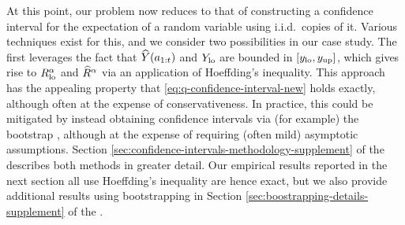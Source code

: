 At this point, our problem now reduces to that of constructing a confidence interval for the expectation of a random variable using i.i.d.\ copies of it.
Various techniques exist for this, and we consider two possibilities in our case study.
The first leverages the fact that $\widehat{Y}(a_{1:t})$ and $Y_{\mathrm{lo}}$ are bounded in $[y_{\mathrm{lo}}, y_{\mathrm{up}}]$, which gives rise to $R_{\mathrm{lo}}^{\alpha}$ and $\widehat{R}^{\alpha}$ via an application of Hoeffding's inequality.
This approach has the appealing property that \eqref{eq:q-confidence-interval-new} holds exactly, although often at the expense of conservativeness.
In practice, this could be mitigated by instead obtaining confidence intervals via (for example) the bootstrap \citep{efron1979bootstrap}, although at the expense of requiring (often mild) asymptotic assumptions.
Section \ref{sec:confidence-intervals-methodology-supplement} of the \AppendixName describes both methods in greater detail.
Our empirical results reported in the next section all use Hoeffding's inequality are hence exact, but we also provide additional results using bootstrapping in Section \ref{sec:boostrapping-details-supplement} of the \AppendixName.




